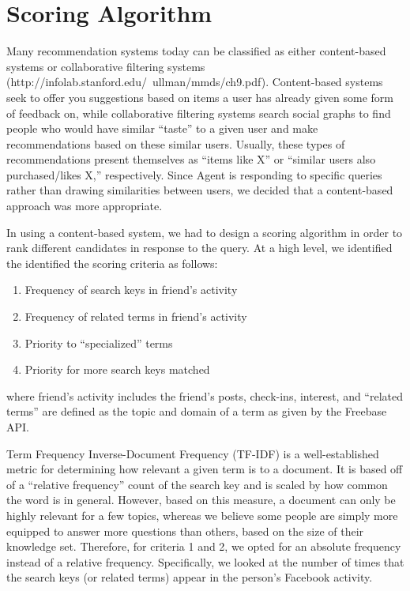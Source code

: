 \section{Scoring Algorithm}
\label{sec:scoring}

Many recommendation systems today can be classified as either content-based
systems or collaborative filtering systems
(http://infolab.stanford.edu/~ullman/mmds/ch9.pdf). Content-based systems seek
to offer you suggestions based on items a user has already given some form of
feedback on, while collaborative filtering systems search social graphs to find
people who would have similar ``taste'' to a given user and make recommendations
based on these similar users. Usually, these types of recommendations present
themselves as ``items like X'' or ``similar users also purchased/likes X,''
respectively. Since Agent is responding to specific queries rather than drawing
similarities between users, we decided that a content-based approach was more
appropriate.

In using a content-based system, we had to design a scoring algorithm in order
to rank different candidates in response to the query. At a high level, we
identified the identified the scoring criteria as follows:
\begin{enumerate}
\item Frequency of search keys in friend's activity
\item Frequency of related terms in friend's activity
\item Priority to ``specialized'' terms
\item Priority for more search keys matched
\end{enumerate}
where friend's activity includes the friend's posts, check-ins, interest,
and ``related terms'' are defined as the topic and domain of a term as given by the Freebase API.

Term Frequency Inverse-Document Frequency (TF-IDF)  is a
well-established metric for determining how relevant a given term is to a
document. It is based off of a ``relative frequency'' count of the search key
and is scaled by how common the word is in general. However, based on this
measure, a document can only be highly relevant for a few topics, whereas we
believe some people are simply more equipped to answer more questions than
others, based on the size of their knowledge set. Therefore, for criteria 1 and
2, we opted for an absolute frequency instead of a relative frequency.
Specifically, we looked at the number of times that the search keys (or related
terms) appear in the person's Facebook activity.

